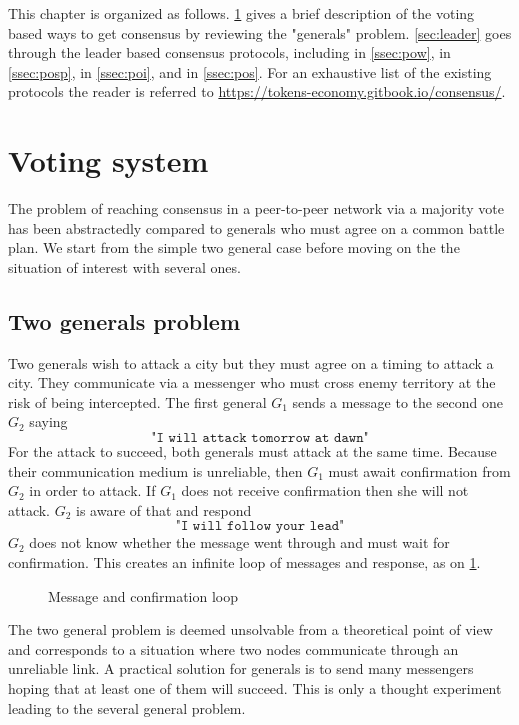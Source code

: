 \noindent This chapter is organized as follows. \cref{sec:voting} gives a brief description of the voting based ways to get consensus by reviewing the "generals" problem. \cref{sec:leader} goes through the leader based consensus protocols, including \PoW in \cref{ssec:pow}, \PoSp in \cref{ssec:posp}, \PoI in \cref{ssec:poi}, and \PoS in \cref{ssec:pos}. For an exhaustive list of the existing protocols the reader is referred to \href{https://tokens-economy.gitbook.io/consensus/}{https://tokens-economy.gitbook.io/consensus/}.

\section{Voting system}\label{sec:voting} 
The problem of reaching consensus in a peer-to-peer network via a majority vote has been abstractedly compared to generals who must agree on a common battle plan. We start from the simple two general case before moving on the the situation of interest with several ones.
\subsection{Two generals problem}
Two generals wish to attack a city but they must agree on a timing to attack a city. They communicate via a messenger who must cross enemy territory at the risk of being intercepted. The first general $G_1$ sends a message to the second one $G_2$ saying 
$$
\texttt{"I will attack tomorrow at dawn"}
$$
For the attack to succeed, both generals must attack at the same time. Because their communication medium is unreliable, then $G_1$ must await confirmation from $G_2$ in order to attack. If $G_1$ does not receive confirmation then she will not attack. $G_2$ is aware of that and respond 
$$
\texttt{"I will follow your lead"}
$$
$G_2$ does not know whether the message went through and must wait for confirmation. This creates an infinite loop of messages and response, as on \cref{fig:message_loop}.
\begin{figure}[ht!]
 \begin{center}
\end{center}
\caption{Message and confirmation loop}
\label{fig:message_loop}
\end{figure}
The two general problem is deemed unsolvable from a theoretical point of view and corresponds to a situation where two nodes communicate through an unreliable link. A practical solution for generals is to send many messengers hoping that at least one of them will succeed. This is only a thought experiment leading to the several general problem. 
